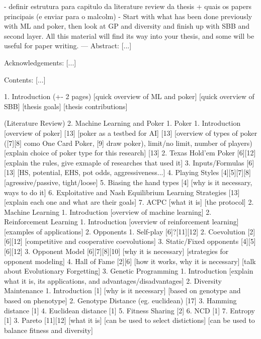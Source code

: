 - definir estrutura para capitulo da literature review da thesis + quais os papers principais (e enviar para o malcolm)
    - Start with what has been done previously with ML and poker, then look at GP and diversity and finish up with SBB and second layer. All this material will find its way into your thesis, and some will be useful for paper writing.
---
Abstract:
[...]

Acknowledgements:
[...]

Contents:
[...]

1. Introduction (+- 2 pages)
    [quick overview of ML and poker]
    [quick overview of SBB]
    [thesis goals]
    [thesis contributions]

(Literature Review)
2. Machine Learning and Poker
    1. Poker
        1. Introduction
            [overview of poker] [13]
            [poker as a testbed for AI] [13]
            [overview of types of poker ([7][8] como One Card Poker, [9] draw poker), limit/no limit, number of players)
            [explain choice of poker type for this research] [13]
        2. Texas Hold’em Poker [6][12]
            [explain the rules, give exmaple of researches that used it]
        3. Inputs/Formulas [6][13]
            [HS, potential, EHS, pot odds, aggressiveness...]
        4. Playing Styles [4][5][7][8]
            [agressive/passive, tight/loose]
        5. Biasing the hand types [4]
            [why is it necessary, ways to do it]
        6. Exploitative and Nash Equilibrium Learning Strategies [13]
            [explain each one and what are their goals]
        7. ACPC
            [what it is]
            [the protocol]
    2. Machine Learning
        1. Introduction
            [overview of machine learning]
        2. Reinforcement Learning
            1. Introduction
                [overview of reinforcement learning]
                [examples of applications]
            2. Opponents
                1. Self-play [6]?[11][12]
                2. Coevolution [2][6][12]
                    [competitive and cooperative coevolutions]
                3. Static/Fixed opponents [4][5][6][12]
            3. Opponent Model [6][7][8][10]
                [why it is necessary]
                [strategies for opponent modeling]
            4. Hall of Fame [2][6]
                [how it works, why it is necessary]
                [talk about Evolutionary Forgetting]
        3. Genetic Programming
            1. Introduction
                [explain what it is, its applications, and advantages/disadvantages]
            2. Diversity Maintenance
                1. Introduction [1]
                    [why is it necessary]
                    [based on genotype and based on phenotype]
                2. Genotype Distance (eg. euclidean) [17]
                3. Hamming distance [1]
                4. Euclidean distance [1]
                5. Fitness Sharing [2]
                6. NCD [1]
                7. Entropy [1]
            3. Pareto [11][12]
                [what it is]
                [can be used to select distictions]
                [can be used to balance fitness and diversity]

